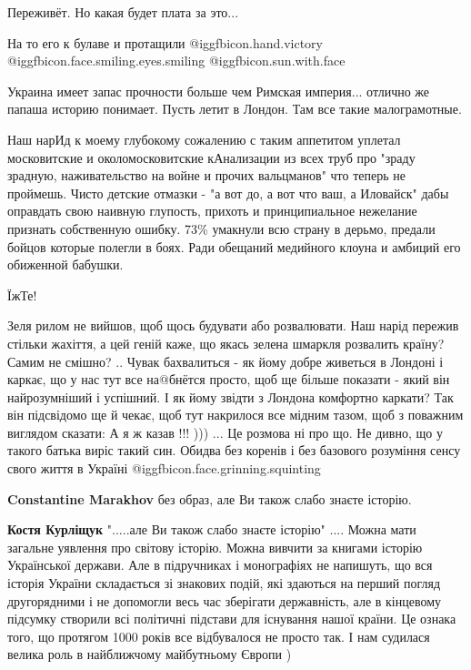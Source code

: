 \begin{itemize}
Переживёт. Но какая будет плата за это...

На то его к булаве и протащили @igg{fbicon.hand.victory}  @igg{fbicon.face.smiling.eyes.smiling}  @igg{fbicon.sun.with.face} 

Украина имеет запас прочности больше чем Римская империя... отлично же папаша историю понимает. Пусть летит в Лондон. Там все такие малограмотные.


Наш нарИд к моему глубокому сожалению с таким аппетитом уплетал московитские и
околомосковитские кАнализации из всех труб про "зраду зрадную, наживательство
на войне и прочих вальцманов" что теперь не проймешь. Чисто детские отмазки -
"а вот до, а вот что ваш, а Иловайск" дабы оправдать свою наивную глупость,
прихоть и принципиальное нежелание признать собственную ошибку. 73\% умакнули
всю страну в дерьмо, предали бойцов которые полегли в боях. Ради обещаний
медийного клоуна и амбиций его обиженной бабушки.

ЇжТе!


Зеля рилом не вийшов, щоб щось будувати або розвалювати. Наш нарід пережив
стільки жахіття, а цей геній каже, що якась зелена шмаркля розвалить країну?
Самим не смішно? .. Чувак бахвалиться - як йому добре живеться в Лондоні і
каркає, що у нас тут все на@бнётся просто, щоб ще більше показати - який він
найрозумніший і успішний. І як йому звідти з Лондона комфортно каркати? Так він
підсвідомо ще й чекає, щоб тут накрилося все мідним тазом, щоб з поважним
виглядом сказати: А я ж казав !!! ))) ... Це розмова ні про що. Не дивно, що у
такого батька виріс такий син. Обидва без коренів і без базового розуміння
сенсу свого життя в Україні  @igg{fbicon.face.grinning.squinting} 

\begin{itemize} %
\textbf{Constantine Marakhov} без образ, але Ви також слабо знаєте історію.

\textbf{Костя Курліщук} ".....але Ви також слабо знаєте історію" .... Можна мати загальне уявлення про світову історію. Можна вивчити за книгами історію Української держави. Але в підручниках і монографіях не напишуть, що вся історія України складається зі знакових подій, які здаються на перший погляд другорядними і не допомогли весь час зберігати державність, але в кінцевому підсумку створили всі політичні підстави для існування нашої країни. Це ознака того, що протягом 1000 років все відбувалося не просто так. І нам судилася велика роль в найближчому майбутньому Європи )


\end{itemize}
\end{itemize}
